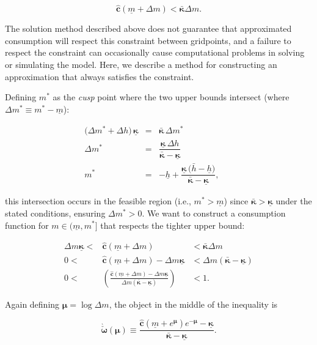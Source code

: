 \documentclass[preprint,authoryear]{elsarticle}
\newcommand{\mNrm}{m}
\newcommand{\cFunc}{\mathbf{c}}
\newcommand{\hNrm}{h}
\newcommand{\hNrmOpt}{\bar{\hNrm}}
\newcommand{\MPC}{\boldsymbol{\kappa}}
\newcommand{\MPCmin}{\underline{\MPC}}
\newcommand{\hNrmPes}{\underline{\hNrm}}
\newcommand{\mNrmMin}{\underline{\mNrm}}
\newcommand{\logmNrmEx}{\boldsymbol{\mu}}
\newcommand{\modRte}{\boldsymbol{\omega}}
\newcommand{\mNrmEx}{\Delta \mNrm}
\newcommand{\hNrmEx}{\Delta \hNrm}
\newcommand{\cFuncReal}{\hat{\cFunc}}
\newcommand{\MPCmax}{\bar{\MPC}}
\newcommand{\mNrmCusp}{\mNrm^*}
\newcommand{\mNrmCuspEx}{\Delta \mNrm^*}
\newcommand{\modRteLoTightUpBd}{\grave{\check{\modRte}}}
\begin{document}
\begin{equation}
\cFuncReal(\mNrmMin+\mNrmEx) < \MPCmax \mNrmEx.
\end{equation}

The solution method described above does not guarantee that approximated
consumption will respect this constraint between gridpoints, and a failure to
respect the constraint can occasionally cause computational problems in solving
or simulating the model. Here, we describe a method for constructing an
approximation that always satisfies the constraint.

Defining $\mNrmCusp$ as the \textit{cusp} point where the two upper bounds intersect
(where $\mNrmCuspEx\equiv\mNrmCusp -\mNrmMin$):

\begin{equation}
\label{eq:mNrmCusp}
\begin{array}{rclcll}
\bigl(\mNrmCuspEx + \hNrmEx\bigr)\,\MPCmin &= & \MPCmax\,\mNrmCuspEx & & \\
\mNrmCuspEx &= & \dfrac{\MPCmin\,\hNrmEx}{\MPCmax-\MPCmin} & & \\
\mNrmCusp &= & -\hNrmPes + \dfrac{\MPCmin\,\bigl(\hNrmOpt-\hNrmPes\bigr)}{\MPCmax-\MPCmin},
\end{array}
\end{equation}

this intersection occurs in the feasible region (i.e., $\mNrmCusp > \mNrmMin$) since $\MPCmax > \MPCmin$ under the stated conditions, ensuring $\mNrmCuspEx > 0$. We want to construct a consumption function for
$\mNrm \in (\mNrmMin, \mNrmCusp]$ that respects the tighter upper
bound:

\begin{equation}
\begin{array}{rcl}
\mNrmEx \MPCmin < & \cFuncReal(\mNrmMin+\mNrmEx) & < \MPCmax \mNrmEx \\
0 < & \cFuncReal(\mNrmMin+\mNrmEx) - \mNrmEx \MPCmin & < \mNrmEx(\MPCmax- \MPCmin) \\
0 < & \left(\frac{\cFuncReal(\mNrmMin+\mNrmEx) - \mNrmEx \MPCmin}{\mNrmEx(\MPCmax- \MPCmin)}\right) & < 1.
\end{array}
\end{equation}

Again defining $\logmNrmEx =\log \mNrmEx$, the object in the middle of
the inequality is

\begin{equation}
\label{eq:modRteLoTightUpBd}
\modRteLoTightUpBd(\logmNrmEx) \equiv  \frac{\cFuncReal(\mNrmMin+e^{\logmNrmEx})e^{-\logmNrmEx}-\MPCmin}{\MPCmax-\MPCmin}.
\end{equation}
\end{document}
